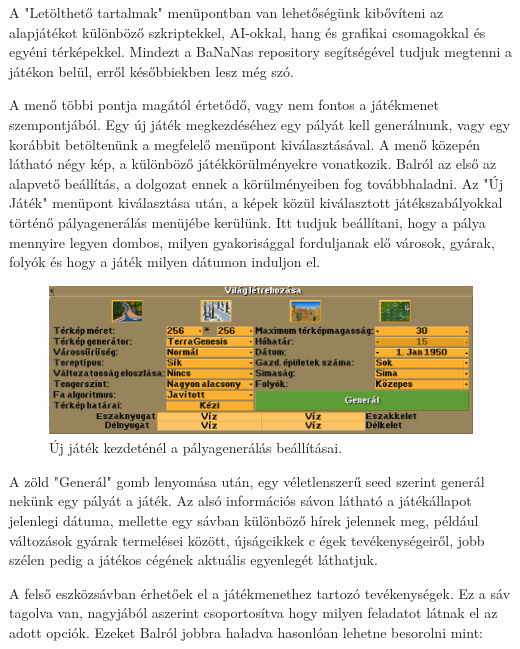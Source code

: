 A "Letölthető tartalmak" menüpontban van lehetőségünk kibővíteni az alapjátékot különböző szkriptekkel, AI-okkal, hang és grafikai csomagokkal és egyéni térképekkel. Mindezt a BaNaNas repository segítségével tudjuk megtenni a játékon belül, erről későbbiekben lesz még szó. 

A menő többi pontja magától értetődő, vagy nem fontos a játékmenet szempontjából. Egy új játék megkezdéséhez egy pályát kell generálnunk, vagy egy korábbit betöltenünk a megfelelő menüpont kiválasztásával. A menő közepén látható négy kép, a különböző játékkörülményekre vonatkozik. Balról az első az alapvető beállítás, a dolgozat ennek a körülményeiben fog továbbhaladni. Az "Új Játék" menüpont kiválasztása után, a képek közül kiválasztott játékszabályokkal történő pályagenerálás menüjébe kerülünk. Itt tudjuk beállítani, hogy a pálya mennyire legyen dombos, milyen gyakorisággal forduljanak elő városok, gyárak, folyók és hogy a játék milyen dátumon induljon el.

\begin{figure}
	\centering
	\includegraphics[scale=0.5]{images/generalas.png}
	\caption{Új játék kezdeténél a pályagenerálás beállításai.}
	\label{fig:generalas}
\end{figure}

A zöld "Generál" gomb lenyomása után, egy véletlenszerű seed szerint generál nekünk egy pályát a játék. Az alsó információs sávon látható a játékállapot jelenlegi dátuma, mellette egy sávban különböző hírek jelennek meg, például változások gyárak termelései között, újságcikkek c égek tevékenységeiről, jobb szélen pedig a játékos cégének aktuális egyenlegét láthatjuk.

A felső eszközsávban érhetőek el a játékmenethez tartozó tevékenységek. Ez a sáv tagolva van, nagyjából aszerint csoportosítva hogy milyen feladatot látnak el az adott opciók. Ezeket Balról jobbra haladva hasonlóan lehetne besorolni mint:

